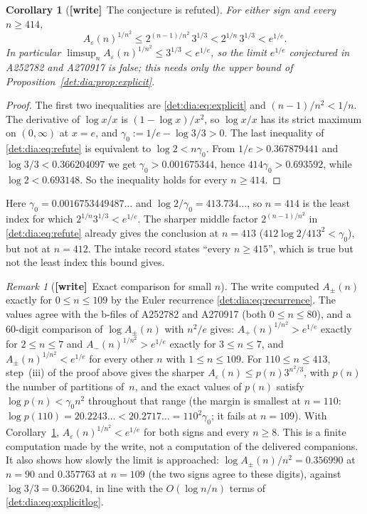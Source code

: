 \documentclass[11pt,letterpaper]{article}
\numberwithin{equation}{section}
\newtheorem{corollary}[theorem]{Corollary}
\theoremstyle{definition}\newtheorem{definition}[theorem]{Definition}
\theoremstyle{remark}\newtheorem{remark}[theorem]{Remark}
\newcommand{\eps}{\varepsilon}
\newcommand{\wtag}{\textup{\textbf{[write]}}}
\begin{document}
\begin{corollary}[\wtag\ The conjecture is refuted]\label{det:dia:cor:refute}
For either sign and every $n\ge414$,
\begin{equation}\label{det:dia:eq:refute}
 A_\eps(n)^{1/n^2}\le2^{(n-1)/n^2}\,3^{1/3}<2^{1/n}\,3^{1/3}<e^{1/e}.
\end{equation}
In particular $\limsup_nA_\eps(n)^{1/n^2}\le3^{1/3}<e^{1/e}$, so the limit $e^{1/e}$ conjectured in A252782 and A270917 is false; this needs only the upper bound of Proposition~\ref{det:dia:prop:explicit}.
\end{corollary}
\begin{proof}
The first two inequalities are \eqref{det:dia:eq:explicit} and $(n-1)/n^2<1/n$. The derivative of $\log x/x$ is $(1-\log x)/x^2$, so $\log x/x$ has its strict maximum on $(0,\infty)$ at $x=e$, and $\gamma_0:=1/e-\log3/3>0$. The last inequality of \eqref{det:dia:eq:refute} is equivalent to $\log2<n\gamma_0$. From $1/e>0.367879441$ and $\log3/3<0.366204097$ we get $\gamma_0>0.001675344$, hence $414\gamma_0>0.693592$, while $\log2<0.693148$. So the inequality holds for every $n\ge414$.
\end{proof}
Here $\gamma_0=0.0016753449487\ldots$ and $\log2/\gamma_0=413.734\ldots$, so $n=414$ is the least index for which $2^{1/n}3^{1/3}<e^{1/e}$. The sharper middle factor $2^{(n-1)/n^2}$ in \eqref{det:dia:eq:refute} already gives the conclusion at $n=413$ ($412\log2/413^2<\gamma_0$), but not at $n=412$. The intake record states ``every $n\ge415$'', which is true but not the least index this bound gives.

\begin{remark}[\wtag\ Exact comparison for small $n$]\label{det:dia:rem:exact}
The write computed $A_\pm(n)$ exactly for $0\le n\le109$ by the Euler recurrence \eqref{det:dia:eq:recurrence}. The values agree with the b-files of A252782 and A270917 (both $0\le n\le80$), and a 60-digit comparison of $\log A_\pm(n)$ with $n^2/e$ gives: $A_+(n)^{1/n^2}>e^{1/e}$ exactly for $2\le n\le7$ and $A_-(n)^{1/n^2}>e^{1/e}$ exactly for $3\le n\le7$, and $A_\pm(n)^{1/n^2}<e^{1/e}$ for every other $n$ with $1\le n\le109$. For $110\le n\le413$, step~(iii) of the proof above gives the sharper $A_\eps(n)\le p(n)3^{n^2/3}$, with $p(n)$ the number of partitions of~$n$, and the exact values of $p(n)$ satisfy $\log p(n)<\gamma_0n^2$ throughout that range (the margin is smallest at $n=110$: $\log p(110)=20.2243\ldots<20.2717\ldots=110^2\gamma_0$; it fails at $n=109$). With Corollary~\ref{det:dia:cor:refute}, $A_\eps(n)^{1/n^2}<e^{1/e}$ for both signs and every $n\ge8$. This is a finite computation made by the write, not a computation of the delivered companions. It also shows how slowly the limit is approached: $\log A_\pm(n)/n^2=0.356990$ at $n=90$ and $0.357763$ at $n=109$ (the two signs agree to these digits), against $\log3/3=0.366204$, in line with the $O(\log n/n)$ terms of \eqref{det:dia:eq:explicitlog}.
\end{remark}
\end{document}
